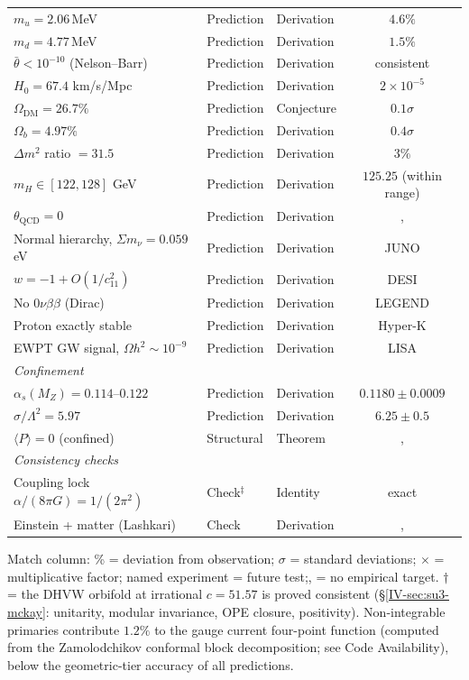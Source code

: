 \begin{center}
\begin{tabular}{lllc}
$m_u = 2.06$\,MeV & Prediction & Derivation & $4.6\%$ \\
$m_d = 4.77$\,MeV & Prediction & Derivation & $1.5\%$ \\
$\bar\theta < 10^{-10}$ (Nelson--Barr) & Prediction & Derivation & consistent \\
$H_0 = 67.4$ km/s/Mpc & Prediction & Derivation & $2 \times 10^{-5}$ \\
$\Omega_{\mathrm{DM}} = 26.7\%$ & Prediction & Conjecture & $0.1\sigma$ \\
$\Omega_b = 4.97\%$ & Prediction & Derivation & $0.4\sigma$ \\
$\Delta m^2$ ratio $= 31.5$ & Prediction & Derivation & $3\%$ \\
$m_H \in [122, 128]$ GeV & Prediction & Derivation & $125.25$ (within range) \\
$\theta_{\mathrm{QCD}} = 0$ & Prediction & Derivation &, \\
Normal hierarchy, $\Sigma m_\nu = 0.059$\,eV & Prediction & Derivation & JUNO \\
$w = -1 + O(1/c_{11}^2)$ & Prediction & Derivation & DESI \\
No $0\nu\beta\beta$ (Dirac) & Prediction & Derivation & LEGEND \\
Proton exactly stable & Prediction & Derivation & Hyper-K \\
EWPT GW signal, $\Omega h^2 \sim 10^{-9}$ & Prediction & Derivation & LISA \\
\midrule
\multicolumn{4}{l}{\emph{Confinement}} \\
$\alpha_s(M_Z) = 0.114$--$0.122$ & Prediction & Derivation & $0.1180 \pm 0.0009$ \\
$\sigma/\Lambda^2 = 5.97$ & Prediction & Derivation & $6.25 \pm 0.5$ \\
$\langle P\rangle = 0$ (confined) & Structural & Theorem &, \\
\midrule
\multicolumn{4}{l}{\emph{Consistency checks}} \\
Coupling lock $\alpha/(8\pi G) = 1/(2\pi^2)$ & Check$^\ddagger$ & Identity & exact \\
Einstein + matter (Lashkari) & Check & Derivation &, \\
\bottomrule
\end{tabular}

\smallskip
\footnotesize
Match column: \% = deviation from observation;
$\sigma$ = standard deviations;
$\times$ = multiplicative factor;
named experiment = future test;, = no empirical target.
$\dagger$ = the DHVW orbifold at irrational $c = 51.57$
is proved consistent (\S\ref*{IV-sec:su3-mckay}: unitarity,
modular invariance, OPE closure, positivity).
Non-integrable primaries contribute $1.2\%$ to the gauge
current four-point function (computed from the Zamolodchikov
conformal block decomposition; see Code Availability),
below the geometric-tier accuracy of all predictions.
\normalsize
\end{center}
